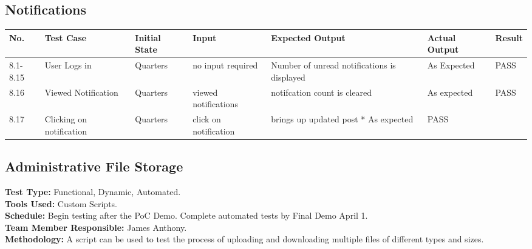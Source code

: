\documentclass[12pt]{article}
\begin{document}
\subsection{Notifications}
\begin{longtable}{|p{1.5cm}|p{1.5cm}|p{1.5cm}|p{2cm}|p{4cm}|p{2cm}|p{1.5cm}|}
\hline
\textbf{No.} & \textbf{Test Case}  & \textbf{Initial State} & \textbf{Input} & \textbf{Expected Output} & \textbf{Actual Output} & \textbf{Result}\\ 
\hline
8.1-8.15 & User Logs in & Quarters & no input required & Number of unread notifications is displayed & As Expected & PASS \\ 
\hline
8.16 & Viewed Notification & Quarters & viewed notifications & notifcation count is cleared & As expected & PASS\\
8.17 & Clicking on notification & Quarters & click on notification & brings up updated post * As expected & PASS\\
\hline
\end{longtable}

\subsection{Administrative File Storage}
\textbf{Test Type:} Functional, Dynamic, Automated. \\
\textbf{Tools Used:} Custom Scripts. \\
\textbf{Schedule:} Begin testing after the PoC Demo. Complete automated tests by Final Demo April 1. \\
\textbf{Team Member Responsible:} James Anthony. \\
\textbf{Methodology:} A script can be used to test the process of uploading and downloading multiple files of different types and sizes.
\end{document}
